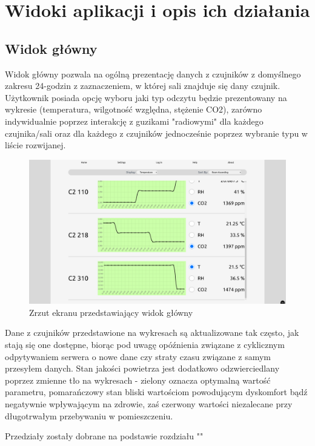 \section{Widoki aplikacji i opis ich działania}

\subsection{Widok główny}
Widok główny pozwala na ogólną prezentację danych z czujników z domyślnego zakresu 24-godzin z zaznaczeniem, w której sali znajduje się dany czujnik. 
Użytkownik posiada opcję wyboru jaki typ odczytu będzie prezentowany na wykresie (temperatura, wilgotność względna, stężenie CO2), zarówno indywidualnie 
poprzez interakcję z guzikami "radiowymi" dla każdego czujnika/sali oraz dla każdego z czujników jednocześnie poprzez wybranie typu
w liście rozwijanej. 

\begin{figure}[H]
    \includegraphics[width=\textwidth]{zdj/app/main.png}
    \caption{Zrzut ekranu przedstawiający widok główny}
\end{figure}

Dane z czujników przedstawione na wykresach są aktualizowane tak często, jak stają się one dostępne, biorąc pod uwagę opóźnienia związane
z cyklicznym odpytywaniem serwera o nowe dane czy straty czasu związane z samym przesyłem danych. Stan jakości powietrza jest dodatkowo
odzwierciedlany poprzez zmienne tło na wykresach - zielony oznacza optymalną wartość parametru, pomarańczowy stan bliski wartościom powodującym
dyskomfort bądź negatywnie wpływającym na zdrowie, zaś czerwony wartości niezalecane przy długotrwałym przebywaniu w pomieszczeniu.

Przedziały zostały dobrane na podstawie rozdziału ""

